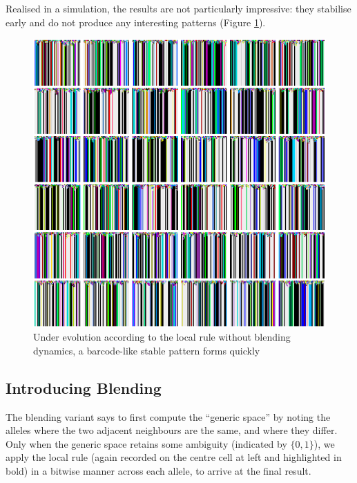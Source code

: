 \documentclass{AISB2008}
\begin{document}
Realised in a simulation, the results are not particularly impressive:
they stabilise early and do not produce any interesting patterns
(Figure \ref{barcode}).

\begin{figure}
\includegraphics[width=\columnwidth,trim = 135mm 177mm 0mm 0mm,clip=true]{paint-drips.png}
\caption{Under evolution according to the local rule without blending
  dynamics, a barcode-like stable pattern forms
  quickly\label{barcode}}
\end{figure}

\subsection{Introducing Blending} \label{introducing-blending}


The blending variant says to first compute the ``generic space'' by
noting the alleles where the two adjacent neighbours are the same, and
where they differ.  Only when the generic space retains some ambiguity
(indicated by $\{0,1\}$), we apply the local rule (again recorded on
the centre cell at left and highlighted in bold) in a bitwise manner
across each allele, to arrive at the final result.
\end{document}
